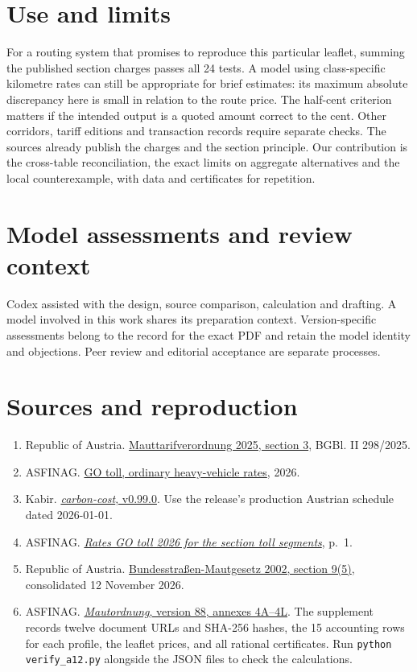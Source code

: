 \documentclass[11pt]{article}
\begin{document}
\section{Use and limits}
For a routing system that promises to reproduce this particular leaflet, summing the published section charges passes all 24 tests. A model using class-specific kilometre rates can still be appropriate for brief estimates: its maximum absolute discrepancy here is small in relation to the route price. The half-cent criterion matters if the intended output is a quoted amount correct to the cent. Other corridors, tariff editions and transaction records require separate checks. The sources already publish the charges and the section principle. Our contribution is the cross-table reconciliation, the exact limits on aggregate alternatives and the local counterexample, with data and certificates for repetition.

\section*{Model assessments and review context}
Codex assisted with the design, source comparison, calculation and drafting. A model involved in this work shares its preparation context. Version-specific assessments belong to the record for the exact PDF and retain the model identity and objections. Peer review and editorial acceptance are separate processes.

\section*{Sources and reproduction}
\begin{enumerate}
\item Republic of Austria. \href{https://ris.bka.gv.at/eli/bgbl/ii/2025/298/P3/NOR40273503}{Mauttarifverordnung 2025, section 3}, BGBl. II 298/2025.
\item ASFINAG. \href{https://go-maut.at/go-maut-bezahlen/tarife-go-maut/}{GO toll, ordinary heavy-vehicle rates}, 2026.
\item Kabir. \href{https://doi.org/10.5281/zenodo.24406888}{\textit{carbon-cost}, v0.99.0}. Use the release's production Austrian schedule dated 2026-01-01.
\item ASFINAG. \href{https://www.go-maut.at/media/zglel2dk/go-maut-tarife-2026_streckenmaut_en.pdf}{\textit{Rates GO toll 2026 for the section toll segments}}, p.~1.
\item Republic of Austria. \href{https://www.ris.bka.gv.at/GeltendeFassung.wxe?Abfrage=Bundesnormen&FassungVom=2026-11-12&Gesetzesnummer=20002090}{Bundesstra\ss en-Mautgesetz 2002, section 9(5)}, consolidated 12 November 2026.
\item ASFINAG. \href{https://www.asfinag.at/maut-vignette/mautordnung/}{\textit{Mautordnung}, version 88, annexes 4A--4L}. The supplement records twelve document URLs and SHA-256 hashes, the 15 accounting rows for each profile, the leaflet prices, and all rational certificates. Run \texttt{python verify\_a12.py} alongside the JSON files to check the calculations.
\end{enumerate}
\end{document}
